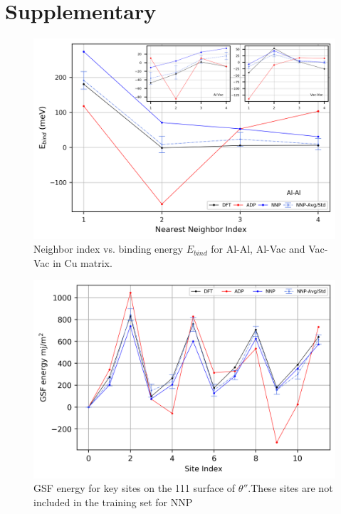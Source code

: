 \documentclass{article}
\begin{document}
\newpage
  

\newpage
\appendix
\section{Supplementary}
\begin{figure}[H]%
\centering%
\includegraphics[width=1.2\textwidth,center]{./figures/solsol_in_cu.png}%
\caption{Neighbor index vs. binding energy $E_{bind}$ for Al-Al, Al-Vac and Vac-Vac in Cu matrix.}%
\label{fig:solsol_in_cu}
\end{figure}


\begin{figure}[H]%
\centering%
\includegraphics[width=540px]{./figures/NOTINOQMD_00002-GSF_111.png}%
\caption{GSF energy for key sites on the 111 surface of  $\theta''$.These sites are not included in the  training set for NNP}%
\end{figure}
\end{document}

